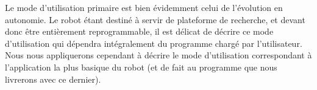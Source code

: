 		Le mode d'utilisation primaire est bien évidemment celui de l'évolution en autonomie. Le robot étant destiné à servir de plateforme de recherche, et devant donc être entièrement reprogrammable, il est délicat de décrire ce mode d'utilisation qui dépendra intégralement du programme chargé par l'utilisateur.\\

		Nous nous appliquerons cependant à décrire le mode d'utilisation correspondant à l'application la plus basique du robot (et de fait au programme que nous livrerons avec ce dernier).